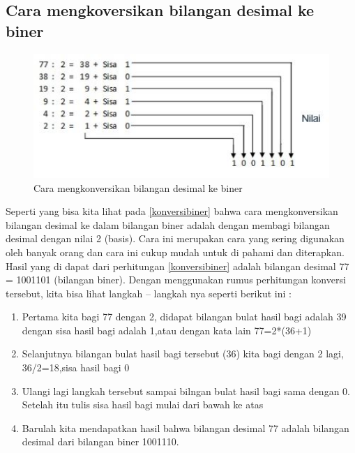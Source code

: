 {\begin{itemize}
\begin{itemize}
\subsection{Cara mengkoversikan bilangan desimal ke biner}
\begin{figure}[ht]
\centerline{\includegraphics[width=1\textwidth]{figures/konversibiner.JPG}}
\caption{Cara mengkonversikan bilangan desimal ke biner}
\label{Contoh Konversi Bilangan Desimal}
\end{figure}
Seperti yang bisa kita lihat pada \ref{konversibiner} bahwa cara mengkonversikan bilangan desimal ke dalam bilangan biner adalah dengan membagi bilangan desimal dengan nilai 2 (basis). Cara ini merupakan cara yang sering digunakan oleh banyak orang dan cara ini cukup mudah untuk di pahami dan diterapkan. Hasil yang di dapat dari perhitungan \ref{konversibiner} adalah bilangan desimal 77 = 1001101 (bilangan biner). Dengan menggunakan rumus perhitungan konversi tersebut, kita bisa lihat langkah – langkah nya seperti berikut ini : 
\begin{enumerate}
	\item Pertama kita bagi 77 dengan 2, didapat bilangan bulat hasil bagi adalah 39 dengan sisa hasil bagi adalah 1,atau dengan kata lain 77=2*(36+1)
	\item Selanjutnya bilangan bulat hasil bagi tersebut (36) kita bagi dengan 2 lagi, 36/2=18,sisa hasil bagi 0
	\item Ulangi lagi langkah tersebut sampai bilngan bulat hasil bagi sama dengan 0. Setelah itu tulis sisa hasil bagi mulai dari bawah ke atas
	\item Barulah kita mendapatkan hasil bahwa bilangan desimal 77 adalah bilangan desimal dari bilangan biner 1001110.
\end{enumerate}



\end{itemize}
\end{itemize}}
